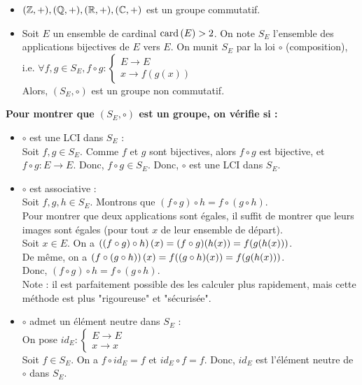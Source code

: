 \documentclass[12pt, a4paper]{report}
\begin{document}
\begin{example}
    \begin{itemize}
        \item $(\mathbb{Z},+),(\mathbb{Q},+),(\mathbb{R},+),(\mathbb{C},+)$ est un groupe commutatif.
        \item Soit $E$ un ensemble de cardinal $\mathrm{card}\left(E\right)> 2$. On note $S_E$ l'ensemble des applications bijectives de $E$ vers $E$. On munit $S_E$ par la loi $\circ$ (composition), i.e. $\forall f,g\in S_E, f\circ g:\begin{cases}E \to E\\x\to f(g(x))\end{cases}$\\
        Alors, $(S_E,\circ)$ est un groupe non commutatif.
    \end{itemize}
    \textbf{Pour montrer que $(S_E,\circ)$ est un groupe, on vérifie si :}
    \begin{itemize}
        \item $\circ$ est une LCI dans $S_E$ :\\Soit $f,g\in S_E$. Comme $f$ et $g$ sont bijectives, alors $f\circ g$ est bijective, et $f\circ g : E \to E$. Donc, $f\circ g\in S_E$. Donc, $\circ$ est une LCI dans $S_E$.
        \item $\circ$ est associative :\\Soit $f,g,h\in S_E$. Montrons que $(f\circ g)\circ h = f\circ (g\circ h)$.\\Pour montrer que deux applications sont égales, il suffit de montrer que leurs images sont égales (pour tout $x$ de leur ensemble de départ).\\Soit $x\in E$. On a $\left(\left(f\circ g\right)\circ h\right)(x) = (f\circ g)(h(x)) = f(g(h(x)))$.\\De même, on a $\left(f\circ \left(g\circ h\right)\right)(x) = f((g\circ h)(x)) = f(g(h(x)))$.\\Donc, $(f\circ g)\circ h = f\circ (g\circ h)$.\\Note : il est parfaitement possible des les calculer plus rapidement, mais cette méthode est plus "rigoureuse" et "sécurisée".
        \item $\circ$ admet un élément neutre dans $S_E$ :\\On pose $id_E:\begin{cases}E\to E\\x\to x\end{cases}$\\Soit $f\in S_E$. On a $f\circ id_E = f$ et $id_E \circ f = f$. Donc, $id_E$ est l'élément neutre de $\circ$ dans $S_E$.

\end{itemize}
\end{example}
\end{document}
